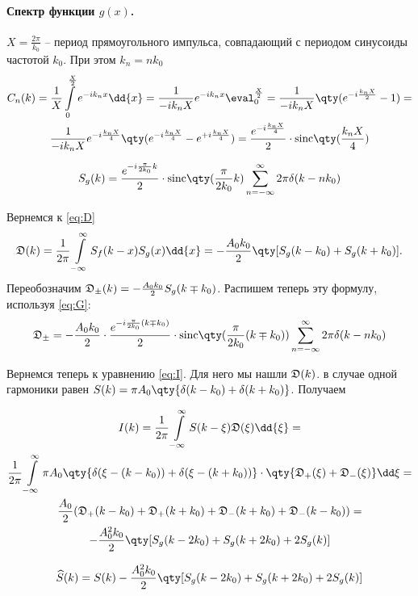 \documentclass[a4paper,14pt]{extarticle}
\begin{document}
\paragraph{Спектр функции $g(x)$.}%
$X = \frac{2\pi}{k_{0}}$ -- период прямоугольного импульса, совпадающий с
периодом синусоиды частотой 
$k_0$. При этом $k_n = n k_0$
\newcommand{\sinc}[1]{\textrm{sinc}\qty(#1)}
\begin{gather}
    C_n(k) = \frac{1}{X} \int\limits_{0}^{\frac{X}{2}} e^{-i k_n x} \dd{x} = 
    \frac{1}{- i k_n X} e^{-i k_n x} \eval_{0}^{\frac{X}{2}} =
    \frac{1}{- i k_n X} \qty( e^{-i \frac{k_n X}{2}} - 1) = \\
    \frac{1}{- i k_n X} e^{-i \frac{k_n X}{4}}\qty( e^{-i \frac{k_n X}{4}} - e^{+i \frac{k_n X}{4}}) = \frac{e^{-i \frac{k_n X}{4}}}{2} \cdot \sinc{\frac{k_n X}{4}}
\end{gather}

\begin{gather}
    \label{eq:G}
    S_g(k) =\frac{e^{-i  \frac{\pi}{2 k_0}  k} }{2}\cdot
    \sinc{\frac{\pi}{2k_{0}}k}\sum\limits_{n=-\infty}^{\infty}  2 \pi\delta(k - n
    k_0)
\end{gather}

Вернемся к \eqref{eq:D} 
\begin{equation}
    \label{eq:}
    \D(k) = \frac{1}{2 \pi} \int\limits_{-\infty}^{\infty} S_f(k-x) S_g(x) \dd{x} = - \frac{A_{0} k_{0}}{2} \qty[S_g(k-k_{0}) + S_g(k+k_{0})].
\end{equation}
Переобозначим $\mathfrak{D}_{\pm}(k) = - \frac{A_{0} k_{0}}{2} S_g(k \mp k_{0})$.
Распишем теперь эту формулу, используя \eqref{eq:G}:
\begin{equation}
    \label{eq:}
    \D_{\pm} = -\frac{A_{0}k_{0}}{2} \cdot \frac{e^{-i  \frac{\pi}{2 k_0}
    (k\mp k_{0})} }{2}\cdot
    \sinc{\frac{\pi}{2k_{0}}(k\mp k_{0})}\sum\limits_{n=-\infty}^{\infty} 2\pi  \delta(k - n
    k_0)
\end{equation}

Вернемся теперь к уравнению \eqref{eq:I}. 
Для него мы нашли $\mathfrak{D}(k)$.
в случае одной гармоники равен  $S(k) = \pi A_0 \qty{\delta(k-k_{0}) +
\delta(k+k_{0})}$.
Получаем

\begin{gather}
    I(k) = \frac{1}{2\pi} \int\limits_{-\infty}^{\infty}  S(k-\xi)
    \D(\xi)\dd{\xi} = \\
    \frac{1}{2\pi} \int\limits_{-\infty}^{\infty} \pi A_{0}\qty{
    \delta(\xi- (k-k_{0}) ) + \delta(\xi - (k+k_{0})) } 
    \cdot \qty{\D_{+}(\xi) + \D_{-}(\xi)} \dd \xi = \\
    \frac{A_{0}}{2} (
    \D_{+}(k-k_{0}) +
    \D_{+}(k+k_{0}) +
    \D_{-}(k+k_{0}) +
    \D_{-}(k-k_{0}) 
    ) = \\
    -\frac{A_{0}^2 k_{0}}{2} \qty[
    S_g(k-2k_{0}) +
    S_g(k+2k_{0}) +
    2S_g(k)
    ]
\end{gather}

\begin{equation}
    \label{eq:}
    \widehat S(k) = S(k)  
    -\frac{A_{0}^2 k_{0}}{2} \qty[
    S_g(k-2k_{0}) +
    S_g(k+2k_{0}) +
    2S_g(k)
    ]
\end{equation}
\end{document}
